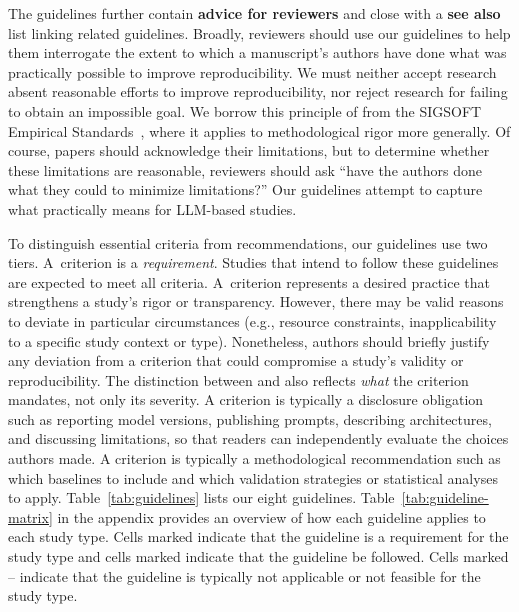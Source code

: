 The guidelines further contain \textbf{advice for reviewers} and close with a \textbf{see also} list linking related guidelines.
Broadly, reviewers should use our guidelines to help them interrogate the extent to which a manuscript's authors have done what was practically possible to improve reproducibility. We must neither accept research absent reasonable efforts to improve reproducibility, nor reject research for failing to obtain an impossible goal. We borrow this principle of  from the SIGSOFT Empirical Standards~\cite{ralph2021empiricalstandardssoftwareengineering}, where it applies to methodological rigor more generally. Of course, papers should acknowledge their limitations, but to determine whether these limitations are reasonable, reviewers should ask ``have the authors done what they could to minimize limitations?'' Our guidelines attempt to capture what  practically means for LLM-based studies.

To distinguish essential criteria from recommendations, our guidelines use two tiers.
A~\must criterion is a \emph{requirement}. Studies that intend to follow these
guidelines are expected to meet all \must criteria.
A~\should criterion represents a desired practice that strengthens a study's rigor or transparency.
However, there may be valid reasons to deviate in particular circumstances (e.g., resource constraints, inapplicability to a specific study context or type).
Nonetheless, authors should briefly justify any deviation from a \should criterion that could compromise a study's validity or reproducibility.
The distinction between \must and \should also reflects \emph{what} the criterion mandates, not only its severity.
A \must criterion is typically a disclosure obligation such as reporting model versions, publishing prompts, describing architectures, and discussing limitations, so that readers can independently evaluate the choices authors made.
A \should criterion is typically a methodological recommendation such as which baselines to include and which validation strategies or statistical analyses to apply.
\ifpaper
Table~\ref{tab:guidelines} lists our eight guidelines.
Table~\ref{tab:guideline-matrix} in the appendix provides an overview of how each guideline applies to each study type.
Cells marked \iconM indicate that the guideline is a \must requirement for the study type and cells marked \iconS indicate that the guideline \should be followed.
Cells marked -- indicate that the guideline is typically not applicable or not feasible for the study type.
\fi

